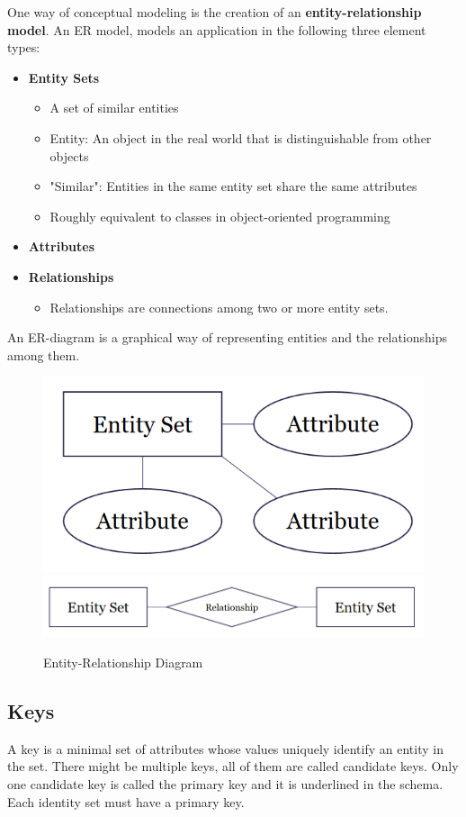 \noindent One way of conceptual modeling is the creation of an \textbf{entity-relationship model}. An ER model, models an application in the following three element types:
\begin{itemize}
\item \textbf{Entity Sets}
\begin{itemize}
\item A set of similar entities
\item Entity: An object in the real world that is distinguishable from other objects
\item "Similar": Entities in the same entity set share the same attributes
\item Roughly equivalent to classes in object-oriented programming
\end{itemize}
\item \textbf{Attributes}
\item \textbf{Relationships}
\begin{itemize}
\item Relationships are connections among two or more entity sets.
\end{itemize}
\end{itemize}
An ER-diagram is a graphical way of representing entities and the relationships among them.
\begin{figure}[H]
\centering
\includegraphics[width=.4\textwidth]{images/entity_set.PNG}
\includegraphics[width=.5\textwidth]{images/relationships.PNG}
\label{er_diagram}
\caption{Entity-Relationship Diagram}
\end{figure}
\subsection{Keys}
A key is a minimal set of attributes whose values uniquely identify an entity in the set. There might be multiple keys, all of them are called candidate keys. Only one candidate key is called the primary key and it is underlined in the schema. Each identity set must have a primary key.

